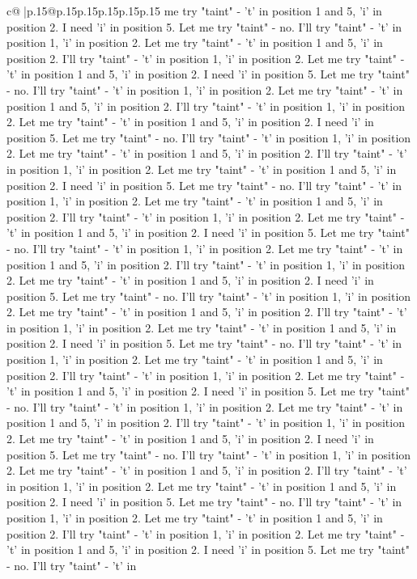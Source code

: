\documentclass{article}
\begin{document}
{\begin{supertabular}{c@{$\;$}|p{.15\linewidth}@{}p{.15\linewidth}p{.15\linewidth}p{.15\linewidth}p{.15\linewidth}p{.15\linewidth}}
{{{me try "taint" {-} 't' in position 1 and 5, 'i' in position 2. I need 'i' in position 5. Let me try "taint" {-} no. I'll try "taint" {-} 't' in position 1, 'i' in position 2. Let me try "taint" {-} 't' in position 1 and 5, 'i' in position 2. I'll try "taint" {-} 't' in position 1, 'i' in position 2. Let me try "taint" {-} 't' in position 1 and 5, 'i' in position 2. I need 'i' in position 5. Let me try "taint" {-} no. I'll try "taint" {-} 't' in position 1, 'i' in position 2. Let me try "taint" {-} 't' in position 1 and 5, 'i' in position 2. I'll try "taint" {-} 't' in position 1, 'i' in position 2. Let me try "taint" {-} 't' in position 1 and 5, 'i' in position 2. I need 'i' in position 5. Let me try "taint" {-} no. I'll try "taint" {-} 't' in position 1, 'i' in position 2. Let me try "taint" {-} 't' in position 1 and 5, 'i' in position 2. I'll try "taint" {-} 't' in position 1, 'i' in position 2. Let me try "taint" {-} 't' in position 1 and 5, 'i' in position 2. I need 'i' in position 5. Let me try "taint" {-} no. I'll try "taint" {-} 't' in position 1, 'i' in position 2. Let me try "taint" {-} 't' in position 1 and 5, 'i' in position 2. I'll try "taint" {-} 't' in position 1, 'i' in position 2. Let me try "taint" {-} 't' in position 1 and 5, 'i' in position 2. I need 'i' in position 5. Let me try "taint" {-} no. I'll try "taint" {-} 't' in position 1, 'i' in position 2. Let me try "taint" {-} 't' in position 1 and 5, 'i' in position 2. I'll try "taint" {-} 't' in position 1, 'i' in position 2. Let me try "taint" {-} 't' in position 1 and 5, 'i' in position 2. I need 'i' in position 5. Let me try "taint" {-} no. I'll try "taint" {-} 't' in position 1, 'i' in position 2. Let me try "taint" {-} 't' in position 1 and 5, 'i' in position 2. I'll try "taint" {-} 't' in position 1, 'i' in position 2. Let me try "taint" {-} 't' in position 1 and 5, 'i' in position 2. I need 'i' in position 5. Let me try "taint" {-} no. I'll try "taint" {-} 't' in position 1, 'i' in position 2. Let me try "taint" {-} 't' in position 1 and 5, 'i' in position 2. I'll try "taint" {-} 't' in position 1, 'i' in position 2. Let me try "taint" {-} 't' in position 1 and 5, 'i' in position 2. I need 'i' in position 5. Let me try "taint" {-} no. I'll try "taint" {-} 't' in position 1, 'i' in position 2. Let me try "taint" {-} 't' in position 1 and 5, 'i' in position 2. I'll try "taint" {-} 't' in position 1, 'i' in position 2. Let me try "taint" {-} 't' in position 1 and 5, 'i' in position 2. I need 'i' in position 5. Let me try "taint" {-} no. I'll try "taint" {-} 't' in position 1, 'i' in position 2. Let me try "taint" {-} 't' in position 1 and 5, 'i' in position 2. I'll try "taint" {-} 't' in position 1, 'i' in position 2. Let me try "taint" {-} 't' in position 1 and 5, 'i' in position 2. I need 'i' in position 5. Let me try "taint" {-} no. I'll try "taint" {-} 't' in position 1, 'i' in position 2. Let me try "taint" {-} 't' in position 1 and 5, 'i' in position 2. I'll try "taint" {-} 't' in position 1, 'i' in position 2. Let me try "taint" {-} 't' in position 1 and 5, 'i' in position 2. I need 'i' in position 5. Let me try "taint" {-} no. I'll try "taint" {-} 't' in }}}
\end{supertabular}}
\end{document}
